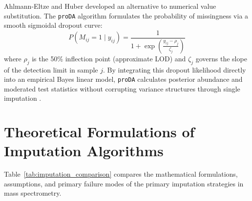 \documentclass[11pt,oneside]{book}
\begin{document}
Ahlmann-Eltze and Huber \cite{ahlmann2020proda} developed an alternative to numerical value substitution. The \texttt{proDA} algorithm formulates the probability of missingness via a smooth sigmoidal dropout curve:
\begin{equation}
P(M_{ij} = 1 \mid y_{ij}) = \frac{1}{1 + \exp\left( \frac{y_{ij} - \rho_j}{\zeta_j} \right)}
\end{equation}
where $\rho_j$ is the 50\% inflection point (approximate LOD) and $\zeta_j$ governs the slope of the detection limit in sample $j$. By integrating this dropout likelihood directly into an empirical Bayes linear model, \texttt{proDA} calculates posterior abundance and moderated test statistics without corrupting variance structures through single imputation \cite{ahlmann2020proda}.

\section{Theoretical Formulations of Imputation Algorithms}

Table~\ref{tab:imputation_comparison} compares the mathematical formulations, assumptions, and primary failure modes of the primary imputation strategies in mass spectrometry.
\end{document}
